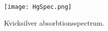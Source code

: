 \begin{figure}[b!]
	\centering
	\texttt{[image: HgSpec.png]}
	\caption{Kvicksilver absorbtionsspectrum.\cite{astronoo}}
	\label{fig:hgspec}
\end{figure}